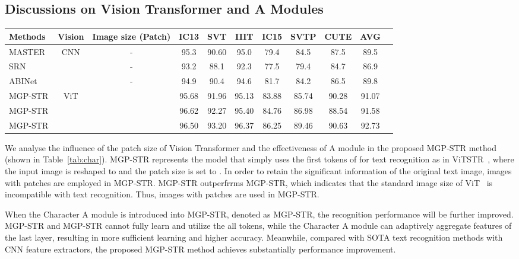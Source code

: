 \documentclass[runningheads]{llncs}
\begin{document}
\subsection{Discussions on Vision Transformer and A Modules} 

\begin{table*}[t]\centering
\setlength{\tabcolsep}{1pt}
\caption{The ablation study of the proposed vision model and the accuracy comparisons with some SOTA methods based on only vision information.}
\label{tab:char}
\begin{tabular}{|l|c|c|c|c|c|c|c|c|c|c|}
\hline
Methods & Vision & Image size (Patch) &IC13&SVT  &IIIT   & IC15 & SVTP &CUTE  &AVG \\
\hline
MASTER~\cite{MASTER} &   \multirow{3}{*}{CNN}  & - &95.3 &90.60 &95.0 &79.4 &84.5 &87.5 &89.5	 \\
SRN~\cite{SRN}  &  & - &93.2 &88.1 &92.3 &77.5 &79.4 &84.7 &86.9	 \\
ABINet~\cite{ABInet}   &  & - &94.9 &90.4 &94.6 &81.7 &84.2 &86.5 &89.8 \\
\hline
MGP-STR &  \multirow{3}{*}{ViT}   &  &95.68	&91.96	&95.13	&83.88	&85.74	&90.28	&91.07	 \\
MGP-STR &  &  &96.62	&92.27	&95.40	&84.76	&86.98	&88.54	&91.58	 \\
MGP-STR  &  &  &96.50 &93.20 &{96.37} &86.25 &89.46 &{90.63} &92.73 \\
\hline
\end{tabular}
\end{table*}

We analyse the influence of the patch size of Vision Transformer and the effectiveness of A module in the proposed MGP-STR method (shown in Table~\ref{tab:char}). MGP-STR represents the model that simply uses the first  tokens of  for text recognition as in ViTSTR~\cite{ViTSTR}, where the input image is reshaped to  and the patch size is set to . In order to retain the significant information of the original text image,  images with  patches are employed in MGP-STR. MGP-STR outperfrrms MGP-STR, which indicates that the standard image size of ViT~\cite{dosovitskiy2020image,deit} is incompatible with text recognition. Thus,  images with  patches are used in MGP-STR.

When the Character A module is introduced into MGP-STR, denoted as MGP-STR, the recognition performance will be further improved. MGP-STR and MGP-STR cannot fully learn and utilize the all tokens, while the Character A module can adaptively aggregate features of the last layer, resulting in more sufficient learning and higher accuracy. Meanwhile, compared with SOTA text recognition methods with CNN feature extractors, the proposed MGP-STR method achieves substantially performance improvement.
\end{document}
